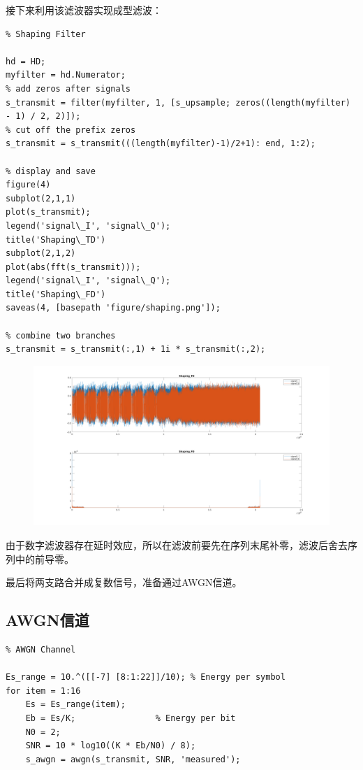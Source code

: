 \begin{spacing}{1.5}
接下来利用该滤波器实现成型滤波：

\begin{lstlisting}
% Shaping Filter

hd = HD;
myfilter = hd.Numerator;
% add zeros after signals
s_transmit = filter(myfilter, 1, [s_upsample; zeros((length(myfilter) - 1) / 2, 2)]);
% cut off the prefix zeros
s_transmit = s_transmit(((length(myfilter)-1)/2+1): end, 1:2);

% display and save
figure(4)
subplot(2,1,1)
plot(s_transmit);
legend('signal\_I', 'signal\_Q');
title('Shaping\_TD')
subplot(2,1,2)
plot(abs(fft(s_transmit)));
legend('signal\_I', 'signal\_Q');
title('Shaping\_FD')
saveas(4, [basepath 'figure/shaping.png']);

% combine two branches
s_transmit = s_transmit(:,1) + 1i * s_transmit(:,2);
\end{lstlisting}

\begin{figure}[H]
\centering
\includegraphics[width = \columnwidth]{shaping.png}
\end{figure}

由于数字滤波器存在延时效应，所以在滤波前要先在序列末尾补零，滤波后舍去序列中的前导零。

最后将两支路合并成复数信号，准备通过AWGN信道。

\subsection{AWGN信道}

\begin{lstlisting}
% AWGN Channel

Es_range = 10.^([[-7] [8:1:22]]/10); % Energy per symbol
for item = 1:16
    Es = Es_range(item);
    Eb = Es/K;                % Energy per bit
    N0 = 2;
    SNR = 10 * log10((K * Eb/N0) / 8);
    s_awgn = awgn(s_transmit, SNR, 'measured');
    

\end{lstlisting}
\end{spacing}
